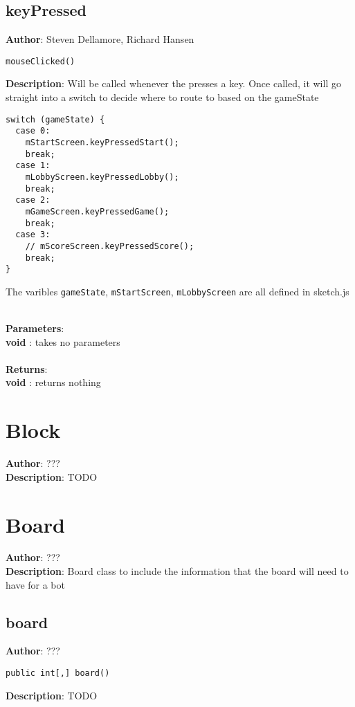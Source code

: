 \documentclass[12pt]{article}
\begin{document}
\subsection{keyPressed}
\textbf{Author}: Steven Dellamore, Richard Hansen 
\vspace*{1\baselineskip}
\begin{lstlisting}
mouseClicked()
\end{lstlisting} 
\vspace*{1\baselineskip}
\textbf{Description}: Will be called whenever the presses a key. Once called, it will go straight into a switch to decide where to route to based on the gameState 
\begin{verbatim}
switch (gameState) {
  case 0:
    mStartScreen.keyPressedStart();
    break;
  case 1:
    mLobbyScreen.keyPressedLobby();
    break;
  case 2:
    mGameScreen.keyPressedGame();
    break;
  case 3:
    // mScoreScreen.keyPressedScore();
    break;
}
\end{verbatim}
 The varibles \texttt{gameState}, \texttt{mStartScreen}, \texttt{mLobbyScreen} are all defined in sketch.js 


\textbf{\large{\\Parameters}}:\\
\textbf{void }: takes no parameters\\\textbf{\large{\\Returns}}:\\\textbf{void }: returns nothing

\section{Block}
\textbf{Author}: ??? \\
\textbf{Description}: TODO \\



\section{Board}
\textbf{Author}: ??? \\
\textbf{Description}: Board class to include the information that the board will need to have for a bot \\



\subsection{board}
\textbf{Author}: ??? 
\vspace*{1\baselineskip}
\begin{lstlisting}
public int[,] board()
\end{lstlisting} 
\vspace*{1\baselineskip}
\textbf{Description}: TODO 
\end{document}
